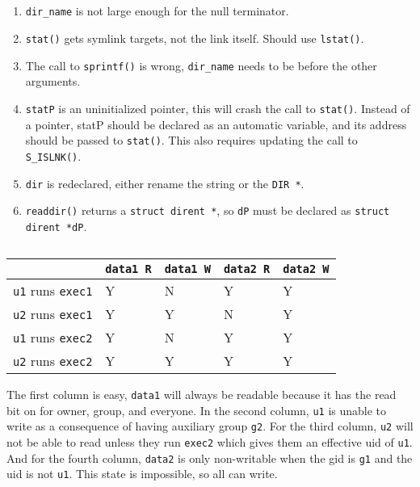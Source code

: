 \documentclass[a4paper,11pt]{article}
\def\code#1{\texttt{#1}}
\begin{document}
\subsection{}
\begin{enumerate}
  \item \code{dir\_name} is not large enough for the null terminator.
  \item \code{stat()} gets symlink targets, not the link itself.
    Should use \code{lstat()}.
  \item The call to \code{sprintf()} is wrong, \code{dir\_name} needs to be
    before the other arguments.
  \item \code{statP} is an uninitialized pointer, this will crash the call to
    \code{stat()}.
    Instead of a pointer, statP should be declared as an automatic variable,
    and its address should be passed to \code{stat()}.
    This also requires updating the call to \code{S\_ISLNK()}.
  \item \code{dir} is redeclared, either rename the string or the \code{DIR *}.
  \item \code{readdir()} returns a \code{struct dirent *}, so \code{dP} must be
    declared as \code{struct dirent *dP}.
\end{enumerate}


\subsection{}
\begin{tabular}{| l | l | l | l | l |}
  \hline
  & \code{data1 R} & \code{data1 W} & \code{data2 R} & \code{data2 W} \\ \hline
  \code{u1} runs \code{exec1} & Y & N & Y & Y \\ \hline
  \code{u2} runs \code{exec1} & Y & Y & N & Y \\ \hline
  \code{u1} runs \code{exec2} & Y & N & Y & Y \\ \hline
  \code{u2} runs \code{exec2} & Y & Y & Y & Y \\ \hline
\end{tabular}

The first column is easy, \code{data1} will always be readable because it has the read
bit on for owner, group, and everyone.
In the second column, \code{u1} is unable to write as a consequence of having
auxiliary group \code{g2}.
For the third column, \code{u2} will not be able to read unless they run \code{exec2}
which gives them an effective uid of \code{u1}.
And for the fourth column, \code{data2} is only non-writable when the gid is \code{g1}
and the uid is not \code{u1}.
This state is impossible, so all can write.
\end{document}
